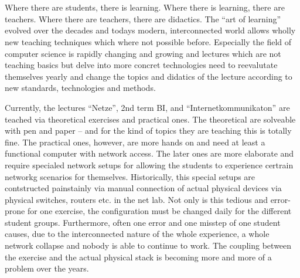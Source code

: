 \section*{}

Where there are students, there is learning.
Where there is learning, there are teachers.
Where there are teachers, there are didactics.
The \enquote{art of learning} evolved over the decades and todays modern,
interconnected world allows wholly new teaching techniques which where not possible before.
Especially the field of computer science is rapidly changing and growing and lectures
which are not teaching basics but delve into more concret technologies need to reevalutate
themselves yearly and change the topics and didatics of the lecture according to new standards,
technologies and methods.

Currently, the lectures \enquote{Netze}, 2nd term BI, and \enquote{Internetkommunikaton}
are teached via theoretical exercises and practical ones.
The theoretical are solveable with pen and paper – and
for the kind of topics they are teaching this is totally fine.
The practical ones, however, are more hands on and need at least a functional computer with network access.
The later ones are more elaborate and require specialed network setups for allowing
the students to experience certrain networkg scenarios for themselves. 
Historically, this special setups are contstructed painstainly via manual 
connection of actual physical devices via physical switches, routers etc. in the net lab.
Not only is this tedious and error-prone for one exercise, 
the configuration must be changed daily for the different student groups.
Furthermore, often one error and one misstep of one student causes,
due to the interconnected nature of the whole experience, a whole network collapse
and nobody is able to continue to work.
The coupling between the exercise and the actual physical stack
is becoming more and more of a problem over the years.

